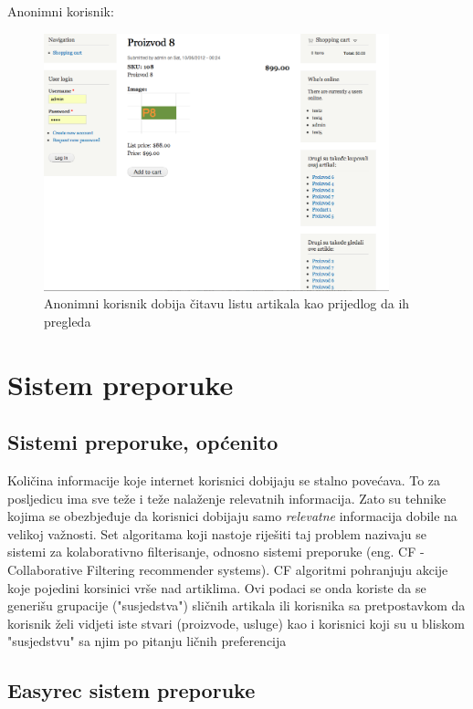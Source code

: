 \documentclass[times, utf8, seminar]{fit}
\begin{document}
{{Anonimni korisnik:

\begin{figure}[H]
\centering
\includegraphics[width=10cm]{img/preporuka_anonimni_korisnik.png}
\caption{Anonimni korisnik dobija čitavu listu artikala kao prijedlog da ih pregleda}
\end{figure}

\chapter {Sistem preporuke}
\vspace*{-0.7cm}

\section{Sistemi preporuke, općenito}

Količina informacije koje internet korisnici dobijaju se stalno povećava. To za posljedicu ima sve teže i teže nalaženje relevatnih informacija. 
Zato su tehnike kojima se obezbjeđuje da korisnici dobijaju samo \emph{relevatne} informacija dobile na velikoj važnosti. 
Set algoritama koji nastoje riješiti taj problem nazivaju se sistemi za kolaborativno filterisanje, odnosno sistemi preporuke (eng. CF - Collaborative Filtering recommender systems). 
CF algoritmi pohranjuju akcije koje pojedini korsinici vrše nad artiklima.
Ovi podaci se onda koriste da se generišu grupacije ("susjedstva") sličnih artikala ili korisnika sa pretpostavkom
da korisnik želi vidjeti iste stvari (proizvode, usluge) kao i korisnici koji su u bliskom "susjedstvu" sa njim po pitanju ličnih preferencija\citep{bac_wien}

\section{Easyrec sistem preporuke}

}}
\end{document}
